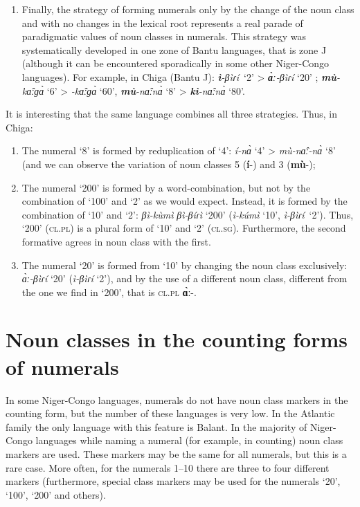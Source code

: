 \begin{enumerate}
\item  Finally, the strategy of forming numerals only by the change of the noun class and with no changes in the lexical root represents a real parade of paradigmatic values of noun classes in numerals. This strategy was systematically developed in one zone of Bantu languages, that is zone J (although it can be encountered sporadically in some other Niger-Congo languages). For example, in Chiga (Bantu J): \textbf{\textit{ì}}\textit{-}\textit{βìɾí}~‘2’ > \textbf{\textit{{\`{ɑ}}ː}}\textit{-}\textit{βìɾí} ‘20’ ;  \textbf{\textit{m{\`{u}}}}\textit{-k{\^{ɑ}}ːɡ{\`{ɑ}}} ‘6’ >  \textbf{\textit{{}}}\textit{-k{\^{ɑ}}ːɡ{\`{ɑ}}} ‘60’, \textbf{\textit{m{\`{u}}}}\textit{-n{\^{ɑ}}ːn{\`{ɑ}}} ‘8’ > \textbf{\textit{kì}}\textit{-n{\^{ɑ}}ːn{\`{ɑ}}} ‘80’. 
\end{enumerate}

It is interesting that the same language combines all three strategies. Thus, in Chiga: 

\begin{enumerate}
\item The numeral ‘8’ is formed by reduplication of ‘4’: \textit{í-n{\`{ɑ}}} ‘4’ > \textit{m{\`{u}}-n{\^{ɑ}}ː-n{\`{ɑ}}} ‘8’ (and we can observe the variation of noun classes 5 (\textbf{í}-) and 3 (\textbf{m{\`{u}}}-);
\item The numeral ‘200’ is formed by a word-combination, but not by the combination of ‘100’ and ‘2’ as we would expect. Instead, it is formed by the combination of ‘10’ and ‘2’: \textit{βì-k{\`{u}}mì} \textit{βì-}\textit{βíɾì} ‘200’ (\textit{ì-kúmì} ‘10’, \textit{ì-β}\textit{ìɾí}~‘2’). Thus, ‘200’ (\textsc{cl}.\textsc{pl}) is a plural form of ‘10’ and ‘2’ (\textsc{cl}.\textsc{sg}). Furthermore, the second formative agrees in noun class with the first. 
\item The numeral ‘20’ is formed from ‘10’ by changing the noun class exclusively: \textit{{\`{ɑ}}ː-β}\textit{ìɾí} ‘20’ (\textit{ì-β}\textit{ìɾí} ‘2’), and by the use of a different noun class, different from the one we find in ‘200’, that is \textsc{cl}.\textsc{pl} \textbf{{\`{ɑ}}ː}-.  
\end{enumerate}

\section{Noun classes in the counting forms of numerals} %

In some Niger-Congo languages, numerals do not have noun class markers in the counting form, but the number of these languages is very low. In the Atlantic family the only language with this feature is Balant. In the majority of Niger-Congo languages while naming a numeral (for example, in counting) noun class markers are used. These markers may be the same for all numerals, but this is a rare case. More often, for the numerals 1--10 there are three to four different markers (furthermore, special class markers may be used for the numerals ‘20’, ‘100’, ‘200’ and others). 

